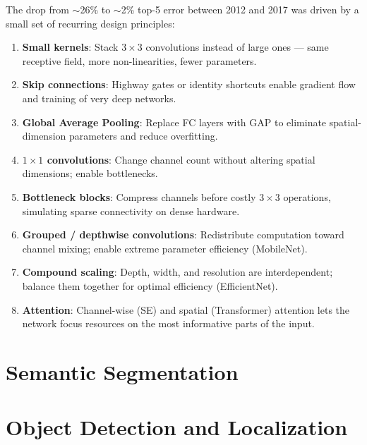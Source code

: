 \documentclass[11pt, oneside]{book}
\begin{document}
The drop from $\sim$26\% to $\sim$2\% top-5 error between 2012 and 2017
was driven by a small set of recurring design principles:

\begin{enumerate}
  \item \textbf{Small kernels}: Stack $3\times3$ convolutions instead of large ones —
        same receptive field, more non-linearities, fewer parameters.
  \item \textbf{Skip connections}: Highway gates or identity shortcuts enable
        gradient flow and training of very deep networks.
  \item \textbf{Global Average Pooling}: Replace FC layers with GAP to eliminate
        spatial-dimension parameters and reduce overfitting.
  \item \textbf{$1\times1$ convolutions}: Change channel count without altering
        spatial dimensions; enable bottlenecks.
  \item \textbf{Bottleneck blocks}: Compress channels before costly $3\times3$ operations,
        simulating sparse connectivity on dense hardware.
  \item \textbf{Grouped / depthwise convolutions}: Redistribute computation toward
        channel mixing; enable extreme parameter efficiency (MobileNet).
  \item \textbf{Compound scaling}: Depth, width, and resolution are interdependent;
        balance them together for optimal efficiency (EfficientNet).
  \item \textbf{Attention}: Channel-wise (SE) and spatial (Transformer) attention
        lets the network focus resources on the most informative parts of the input.
\end{enumerate}


\chapter{Semantic Segmentation}



\chapter{Object Detection and Localization}
\end{document}
